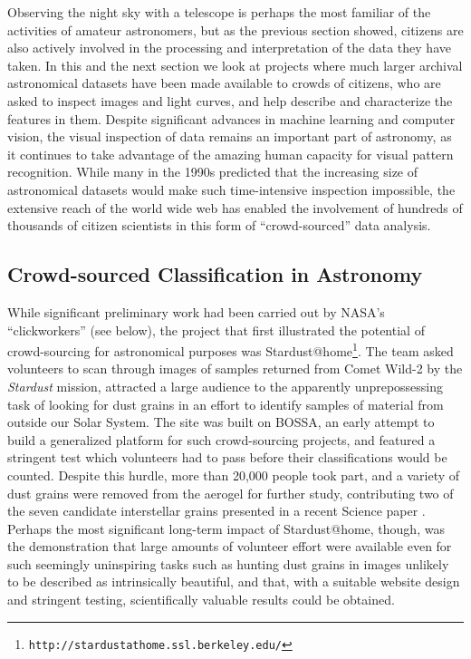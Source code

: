\documentclass{ar2e}
\def\CaseStudy#1{\noindent{\it\bf #1 \,\,\,\,}}
\def\url#1{\texttt{#1}}
\begin{document}
Observing the night sky with a telescope is perhaps the most familiar of the
activities of amateur astronomers, but as the previous section showed, citizens
are also actively involved in the processing and interpretation of the data they
have taken.  In this and the next section we look at projects where much larger
archival astronomical datasets have been made available to crowds of citizens,
who are asked to inspect images and light curves, and help describe and
characterize the features in them. Despite significant advances in machine
learning and computer vision, the visual inspection of data remains an important
part of astronomy, as it continues to take advantage of the amazing human
capacity for visual pattern recognition. While many in the 1990s predicted that
the increasing size of astronomical datasets would make such time-intensive
inspection impossible, the extensive reach of the world wide web has enabled the
involvement of hundreds of thousands of citizen scientists in this form of
``crowd-sourced'' data analysis. 


\subsection{Crowd-sourced Classification in Astronomy}
\label{sec:class:astro}

\CaseStudy{Stardust@home}
While significant preliminary work had been carried out by NASA's
``clickworkers'' (see below), the project that first illustrated the potential
of crowd-sourcing for astronomical purposes was 
Stardust@home\footnote{\url{http://stardustathome.ssl.berkeley.edu/}}. The team
asked volunteers to scan through images of samples returned from Comet Wild-2 by
the \textit{Stardust} mission, attracted a large audience to the apparently
unprepossessing task of looking for dust grains in an effort to identify samples
of material from outside our Solar System. The site was built on BOSSA, an early
attempt to build a generalized platform for such crowd-sourcing projects, and
featured a stringent test which volunteers had to pass before their
classifications would be counted. Despite this hurdle, more than 20,000 people
took part, and a variety of dust grains were removed from the aerogel for
further study, contributing two of the seven candidate interstellar grains
presented in a recent Science paper \citep{Westphal}. Perhaps the most
significant long-term impact of Stardust@home, though, was the demonstration
that large amounts of volunteer effort were available even for such seemingly
uninspiring tasks such as hunting dust grains in images unlikely to be described
as intrinsically beautiful, and that, with a suitable website design and
stringent testing, scientifically valuable results could be obtained. 
\end{document}
